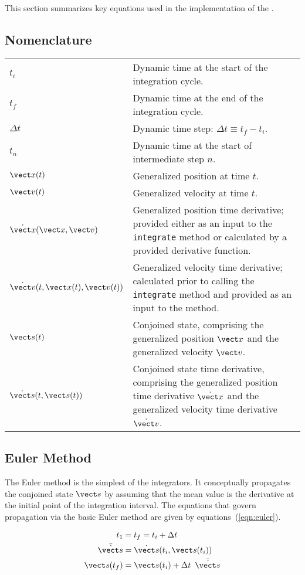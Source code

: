 This section summarizes key equations used in the implementation
of the \ModelDesc.

\subsection{Nomenclature}
\begin{tabular}{@{\hspace{0.25in}} p{1in} p{5in}}
$t_i$ &
  Dynamic time at the start of the integration cycle. \\
$t_f$ &
  Dynamic time at the end of the integration cycle. \\
$\Delta t$ &
  Dynamic time step: $\Delta t \equiv t_f - t_i$. \\
$t_n$ &
  Dynamic time at the start of intermediate step $n$. \\
$\vect x(t)$ &
  Generalized position at time $t$. \\
$\vect v(t)$ &
  Generalized velocity at time $t$. \\
$\dot {\vect x}(\vect x, \vect v)$ &
  Generalized position time derivative; provided either as an input to the
  {\tt integrate} method or calculated by a provided derivative function. \\
$\dot {\vect v}(t, \vect x(t), \vect v(t))$ &
  Generalized velocity time derivative; calculated prior to calling the
  {\tt integrate} method and provided as an input to the method. \\
$\vect s(t)$ &
  Conjoined state, comprising
  the generalized position $\vect x$ and
  the generalized velocity $\vect v$. \\
$\dot {\vect s}(t, \vect s(t))$ &
  Conjoined state time derivative, comprising
  the generalized position time derivative $\dot {\vect x}$ and
  the generalized velocity time derivative $\dot {\vect v}$.
\end{tabular}

\subsection{Euler Method}
The Euler method is the simplest of the integrators.
It conceptually propagates the conjoined state $\vect s$
by assuming that the mean value is the derivative
at the initial point of the integration interval.
The equations that govern propagation via the basic Euler method
are given by equations~(\ref{eqn:euler}).

\begin{equation}
\label{eqn:euler}
\begin{split}
t_1 &= t_f = t_i + \Delta t \\
\bar{\dot{\vect s}} &= \dot{\vect s}(t_i,\vect s(t_i)) \\
\vect s(t_f) &= \vect s(t_i) + \Delta t\ \, \bar{\dot{\vect s}}
\end{split}
\end{equation}


